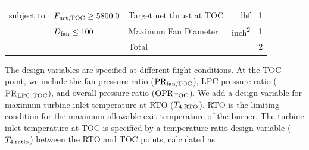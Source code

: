 \documentclass[conf]{new-aiaa}
\begin{document}
\begin{table}[hbt!]
\begin{tabular}{r l l r l}
                        &                                &                                                                          &                  &          \\
        subject to      & $F_{\rm{net,TOC}} \geq 5800.0$ & Target net thrust at TOC                                                 & \unit{lbf}       & 1        \\
                        & $D_{\rm{fan}} \leq 100$        & Maximum Fan Diameter                                                     & \unit{inch^2}    & 1        \\
        \cline{3-5}
                        &                                & Total                                                                    &                  & 2        \\
        \bottomrule
    \end{tabular}
    \label{tab:opt_problem}
\end{table}


The design variables are specified at different flight conditions.
At the TOC point, we include the fan pressure ratio ($\rm{PR}_{\rm{fan,TOC}}$), LPC pressure ratio ($\rm{PR}_{\rm{LPC,TOC}}$), and overall pressure ratio ($\rm{OPR}_{\rm{TOC}}$).
We add a design variable for maximum turbine inlet temperature at RTO ($T_{4,\rm{RTO}}$).
RTO is the limiting condition for the maximum allowable exit temperature of the burner.
The turbine inlet temperature at TOC is specified by a temperature ratio design variable ($T_{4,\rm{ratio}}$) between the RTO and TOC points, calculated as
\end{document}
